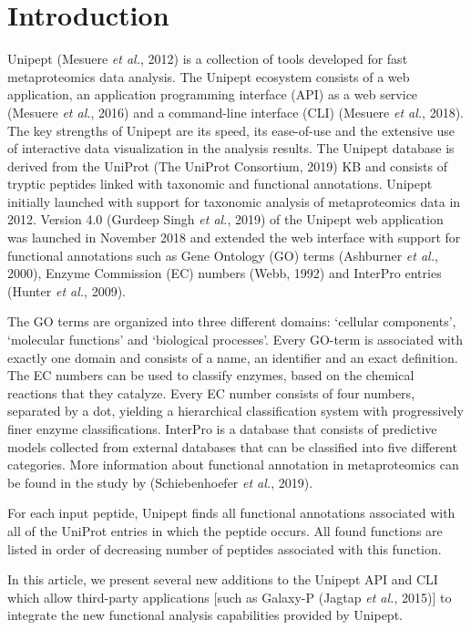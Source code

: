 \hypertarget{introduction-3}{%
\section{Introduction}\label{introduction-3}}

Unipept (Mesuere \emph{et al.}, 2012) is a collection of tools developed
for fast metaproteomics data analysis. The Unipept ecosystem consists of
a web application, an application programming interface (API) as a web
service (Mesuere \emph{et al.}, 2016) and a command-line interface (CLI)
(Mesuere \emph{et al.}, 2018). The key strengths of Unipept are its
speed, its ease-of-use and the extensive use of interactive data
visualization in the analysis results. The Unipept database is derived
from the UniProt (The UniProt Consortium, 2019) KB and consists of
tryptic peptides linked with taxonomic and functional annotations.
Unipept initially launched with support for taxonomic analysis of
metaproteomics data in 2012. Version 4.0 (Gurdeep Singh \emph{et al.},
2019) of the Unipept web application was launched in November 2018 and
extended the web interface with support for functional annotations such
as Gene Ontology (GO) terms (Ashburner \emph{et al.}, 2000), Enzyme
Commission (EC) numbers (Webb, 1992) and InterPro entries (Hunter
\emph{et al.}, 2009).

The GO terms are organized into three different domains: `cellular
components', `molecular functions' and `biological processes'. Every
GO-term is associated with exactly one domain and consists of a name, an
identifier and an exact definition. The EC numbers can be used to
classify enzymes, based on the chemical reactions that they catalyze.
Every EC number consists of four numbers, separated by a dot, yielding a
hierarchical classification system with progressively finer enzyme
classifications. InterPro is a database that consists of predictive
models collected from external databases that can be classified into
five different categories. More information about functional annotation
in metaproteomics can be found in the study by (Schiebenhoefer \emph{et
al.}, 2019).

For each input peptide, Unipept finds all functional annotations
associated with all of the UniProt entries in which the peptide occurs.
All found functions are listed in order of decreasing number of peptides
associated with this function.

In this article, we present several new additions to the Unipept API and
CLI which allow third-party applications {[}such as Galaxy-P (Jagtap
\emph{et al.}, 2015){]} to integrate the new functional analysis
capabilities provided by Unipept.

